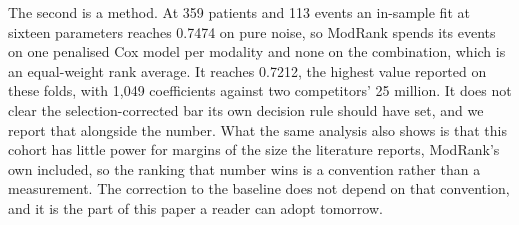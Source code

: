 \documentclass[11pt]{article}
\begin{document}
The second is a method. At 359 patients and 113 events an in-sample fit at sixteen parameters
reaches 0.7474 on pure noise, so ModRank spends its events on one penalised Cox model per modality
and none on the combination, which is an equal-weight rank average. It reaches 0.7212, the highest value reported on these folds, with 1,049 coefficients against two competitors' 25 million. It does not clear the selection-corrected bar its own decision rule should have set, and we report that alongside the number. What the same analysis also shows is that this cohort has little power for
margins of the size the literature reports, ModRank's own included, so the ranking that number wins
is a convention rather than a measurement. The correction to the baseline does not depend on that
convention, and it is the part of this paper a reader can adopt tomorrow.


\end{document}
